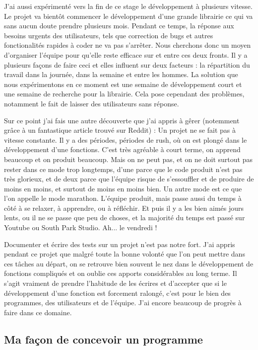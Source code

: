 J'ai aussi expérimenté vers la fin de ce stage le développement à plusieurs vitesse. Le projet va bientôt commencer le développement d'une grande librairie ce qui va sans aucun doute prendre plusieurs mois. Pendant ce temps, la réponse aux besoins urgents des utilisateurs, tels que correction de bugs et autres fonctionalités rapides à coder ne va pas s'arrêter. Nous cherchons donc un moyen d'organiser l'équipe pour qu'elle reste efficace sur et entre ces deux fronts. Il y a plusieurs façons de faire ceci et elles influent sur deux facteurs : la répartition du travail dans la journée, dans la semaine et entre les hommes. La solution que nous expérimentons en ce moment est une semaine de développement court et une semaine de recherche pour la librairie. Cela pose cependant des problèmes, notamment le fait de laisser des utilisateurs sans réponse.

Sur ce point j'ai fais une autre découverte que j'ai appris à gêrer (notemment grâce à un fantastique article trouvé sur Reddit)%
: Un projet ne se fait pas à vitesse constante. Il y a des périodes, périodes de rush, où on est plongé dans le développement d'une fonctions. C'est très agréable à court terme, on apprend beaucoup et on produit beaucoup. Mais on ne peut pas, et on ne doit surtout pas rester dans ce mode trop longtemps, d'une parce que le code produit n'est pas très glorieux, et de deux parce que l'équipe risque de s'essouffler et de produire de moins en moins, et surtout de moins en moins bien. Un autre mode est ce que l'on appelle le mode marathon. L'équipe produit, mais passe aussi du temps à côté à se relaxer, à apprendre, ou à réfléchir. Et puis il y a les bien aimés jours lents, ou il ne se passe que peu de choses, et la majorité du temps est passé sur Youtube ou South Park Studio. Ah... le vendredi !

Documenter et écrire des tests sur un projet n'est pas notre fort. J'ai appris pendant ce projet que malgré toute la bonne volonté que l'on peut mettre dans ces tâches au départ, on se retrouve bien souvent le nez dans le développement de fonctions compliqués et on oublie ces apports considérables au long terme. Il s'agit vraiment de prendre l'habitude de les écrires et d'accepter que si le développement d'une fonction est forcement ralongé, c'est pour le bien des programmes, des utilisateurs et de l'équipe. J'ai encore beaucoup de progrès à faire dans ce domaine.

\subsection{Ma façon de concevoir un programme}


